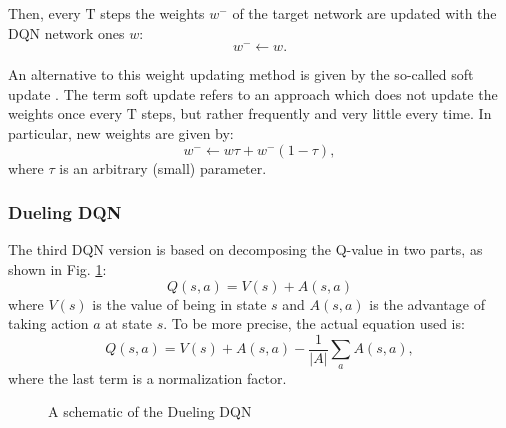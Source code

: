 \documentclass[a4paper, 12pt]{article}
\numberwithin{equation}{section}
\begin{document}
Then, every $\mathrm{T}$ steps the weights $w^-$ of the target network are updated with the DQN network ones $w$:
\begin{equation}
	w^-\leftarrow w.
\end{equation}

An alternative to this weight updating method is given by the so-called soft update \cite{soft-update}. The term soft update refers to an approach which does not update the weights once every $\mathrm{T}$ steps, but rather frequently and very little every time. In particular, new weights are given by:
\begin{equation}
	w^-\leftarrow w\tau+w^-\left(1-\tau\right),
\end{equation}
where $\tau$ is an arbitrary (small) parameter.


\subsubsection{Dueling DQN}

The third DQN version is based on decomposing the Q-value in two parts, as shown in Fig. \ref{fig:dueling}:
\begin{equation}
	Q\left(s,a\right)=V\left(s\right)+A\left(s,a\right)
\end{equation}
where $V\left(s\right)$ is the value of being in state $s$ and $A\left(s,a\right)$ is the advantage of taking action $a$ at state $s$. To be more precise, the actual equation used is:
\begin{equation}
	Q\left(s,a\right)=V\left(s\right)+A\left(s,a\right)-\frac{1}{\left|A\right|}\sum_aA\left(s,a\right),
\end{equation}
where the last term is a normalization factor.

\begin{figure}[h]
	\centering
		\caption{A schematic of the Dueling DQN}
	\label{fig:dueling}
\end{figure}
\end{document}
